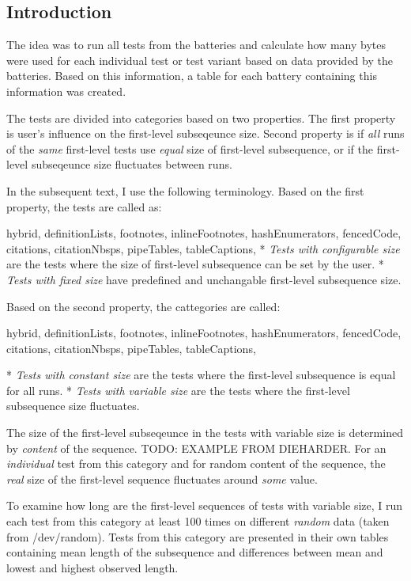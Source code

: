 \documentclass[
  digital,     %
  oneside,     %
  nosansbold,  %
  nocolorbold, %
  nolof,         %
  nolot,         %
]{fithesis4}
\begin{document}
\subsection{Introduction} \label{chap:analysis-data-intro}

The idea was to run all tests from the batteries and calculate how many bytes were used for each individual test or test variant based on data provided by the batteries. Based on this information, a table for each battery containing this information was created.

The tests are divided into categories based on two properties. The first property is user's influence on the first-level subseqeunce size. Second property is if \emph{all} runs of the \emph{same} first-level tests use \emph{equal} size of first-level subsequence, or if the first-level subseqeunce size fluctuates between runs. 

In the subsequent text, I use the following terminology. Based on the first property, the tests are called as:
\begin{markdown*}{%
  hybrid,
  definitionLists,
  footnotes,
  inlineFootnotes,
  hashEnumerators,
  fencedCode,
  citations,
  citationNbsps,
  pipeTables,
  tableCaptions,
}
* \emph{Tests with configurable size} are the tests where the size of first-level subsequence can be set by the user.
* \emph{Tests with fixed size} have predefined and unchangable first-level subsequence size.
\end{markdown*}
Based on the second property, the cattegories are called:
\begin{markdown*}{%
  hybrid,
  definitionLists,
  footnotes,
  inlineFootnotes,
  hashEnumerators,
  fencedCode,
  citations,
  citationNbsps,
  pipeTables,
  tableCaptions,
}

* \emph{Tests with constant size} are the tests where the first-level subsequence is equal for all runs.
* \emph{Tests with variable size} are the tests where the first-level subsequence size fluctuates.

\end{markdown*}

The size of the first-level subseqeunce in the tests with variable size is determined by \emph{content} of the sequence. TODO: EXAMPLE FROM DIEHARDER. For an \emph{individual} test from this category and for random content of the sequence, the \emph{real} size of the first-level sequence fluctuates around \emph{some} value. 

To examine how long are the first-level sequences of tests with variable size, I run each test from this category at least 100 times on different \emph{random} data (taken from /dev/random). Tests from this category are presented in their own tables containing mean length of the subsequence and differences between mean and lowest and highest observed length.
\end{document}
